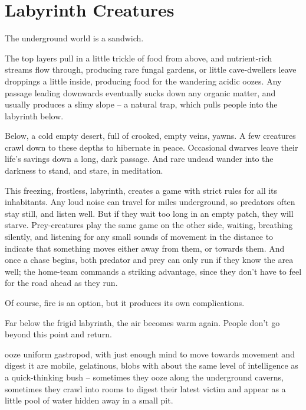 \section[Labyrinth Creatures]{Labyrinth Creatures \A}

\begin{multicols}{2}

\noindent
The underground world is a sandwich.

The top layers pull in a little trickle of food from above, and nutrient-rich streams flow through, producing rare fungal gardens, or little cave-dwellers leave droppings a little inside, producing food for the wandering acidic oozes.
Any passage leading downwards eventually sucks down any organic matter, and usually produces a slimy slope -- a natural trap, which pulls people into the labyrinth below.

Below, a cold empty desert, full of crooked, empty veins, yawns.
A few creatures crawl down to these depths to hibernate in peace.
Occasional dwarves leave their life's savings down a long, dark passage.
And rare undead wander into the darkness to stand, and stare, in meditation.

This freezing, frostless, labyrinth, creates a game with strict rules for all its inhabitants.
Any loud noise can travel for miles underground, so predators often stay still, and listen well.
But if they wait too long in an empty patch, they will starve.
Prey-creatures play the same game on the other side, waiting, breathing silently, and listening for any small sounds of movement in the distance to indicate that something moves either away from them, or towards them.
And once a chase begins, both predator and prey can only run if they know the area well; the home-team commands a striking advantage, since they don't have to feel for the road ahead as they run.

Of course, fire is an option, but it produces its own complications.

Far below the frigid labyrinth, the air becomes warm again.
People don't go beyond this point and return.

  {ooze}%
  {uniform gastropod, with just enough mind to move towards movement and digest it}%
are mobile, gelatinous, blobs with about the same level of intelligence as a quick-thinking bush -- sometimes they ooze along the underground caverns, sometimes they crawl into rooms to digest their latest victim and appear as a little pool of water hidden away in a small pit.


\end{multicols}
